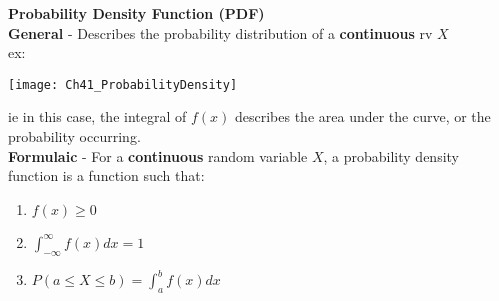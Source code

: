 \documentclass[../INDE315.tex]{subfiles}
\begin{document}
\begin{defn}
    \textbf{Probability Density Function (PDF)} \\
    \textbf{General} - Describes the probability distribution of a \textbf{continuous} rv $X$ \\
    ex: 
    \begin{center}
        \texttt{[image: Ch41\_ProbabilityDensity]}
    \end{center}
    ie in this case, the integral of $f(x)$ describes the area under the curve, or the probability occurring. \\
    \textbf{Formulaic} - For a \textbf{continuous} random variable $X$, a probability density function is a function such that:
    \begin{enumerate}
        \item $f(x) \geq 0$
        \item $\int_{- \infty}^{\infty}f(x) dx = 1$ 
        \item $P(a \leq X \leq b) = \int _a ^b f(x) dx$
    \end{enumerate}
\end{defn}
\end{document}
